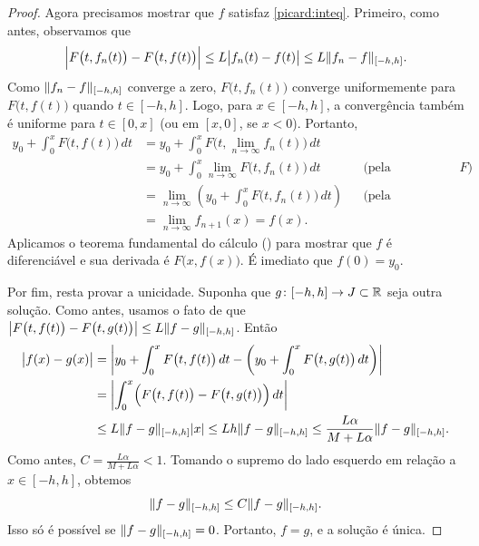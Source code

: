 \begin{proof}
Agora precisamos mostrar que $f$ satisfaz \eqref{picard:inteq}.
Primeiro, como antes, observamos que
\begin{equation*}
\Bigl\lvert {F\bigl(t,f_{n}(t)\bigr) - 
F\bigl(t,f(t)\bigr)} \Bigr\rvert
\leq
L \bigl\lvert {f_n(t)-f(t)} \bigr\rvert
\leq
L \lVert {f_n-f} \rVert_{[-h,h]} .
\end{equation*}
Como $\lVert {f_n-f} \rVert_{[-h,h]}$ converge a zero,
$F\bigl(t,f_n(t)\bigr)$ converge uniformemente para $F\bigl(t,f(t)\bigr)$
quando $t \in [-h,h]$. Logo, para $x \in [-h,h]$, a convergência também
é uniforme %
para $t \in [0,x]$ (ou em $[x,0]$, se $x < 0$). Portanto,
\begin{align*}
y_0
+
\int_0^{x}
F(t,f(t)\bigr)\,dt
& =
y_0
+
\int_0^{x}
F\bigl(t,\lim_{n\to\infty} f_n(t)\bigr)\,dt
& &
\\
& =
y_0
+
\int_0^{x}
\lim_{n\to\infty} F\bigl(t,f_n(t)\bigr)\,dt
& & \text{(pela continuidade de } F\text{)}
\\
& =
\lim_{n\to\infty} 
\left(
y_0
+
\int_0^{x}
F\bigl(t,f_n(t)\bigr)\,dt
\right)
& & \text{(pela convergência uniforme)}
\\
& =
\lim_{n\to\infty} 
f_{n+1}(x)
=
f(x) .
& &
\end{align*}
Aplicamos o teorema fundamental do cálculo () para
mostrar que $f$ é diferenciável e sua derivada é $F\bigl(x,f(x)\bigr)$.
É imediato que $f(0) = y_0$.

Por fim, resta provar a unicidade. Suponha que
$g \colon [-h,h] \to J \subset {\mathbb{R}}$ seja outra solução.
Como antes, usamos o fato de que
$\bigl\lvert {F\bigl(t,f(t)\bigr) - F\bigl(t,g(t)\bigr)} \bigr\rvert \leq L \lVert {f-g} \rVert_{[-h,h]}$.
Então
\begin{equation*}
\begin{split}
\bigl\lvert {f(x)-g(x)} \bigr\rvert
& =
\left\lvert {
y_0
+
\int_0^{x}
F\bigl(t,f(t)\bigr)\,dt
-
\left(
y_0
+
\int_0^{x}
F\bigl(t,g(t)\bigr)\,dt
\right)
} \right\rvert
\\
& =
\left\lvert {
\int_0^{x}
\Bigl(
F\bigl(t,f(t)\bigr)
-
F\bigl(t,g(t)\bigr)
\Bigr)
\,dt
} \right\rvert
\\
& \leq
L\lVert {f-g} \rVert_{[-h,h]}\lvert {x} \rvert
\leq
Lh\lVert {f-g} \rVert_{[-h,h]}
\leq
\frac{L\alpha}{M+L\alpha}\lVert {f-g} \rVert_{[-h,h]} .
\end{split}
\end{equation*}
Como antes, $C = \frac{L\alpha}{M+L\alpha} < 1$. Tomando o supremo do
lado esquerdo em relação a $x \in [-h,h]$, obtemos
\begin{equation*}
\lVert {f-g} \rVert_{[-h,h]} \leq C \lVert {f-g} \rVert_{[-h,h]} .
\end{equation*}
Isso só é possível se $\lVert {f-g} \rVert_{[-h,h]} = 0$. Portanto, $f=g$, e a
solução é única.
\end{proof}

